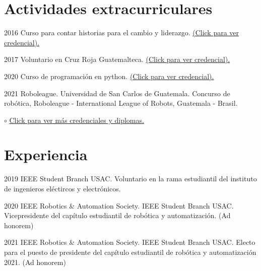 \documentclass[]{twentysecondcv}
\begin{document}

\section{Actividades extracurriculares}

\begin{twentyshort}

	\twentyitemshort
    	{2016}
    	{Curso para contar historias para el cambio y liderazgo. \href{https://www.coursera.org/account/accomplishments/verify/HG4MHZYP8JXW}{(Click para ver credencial).}}
    
	\twentyitemshort
    	{2017}
    	{Voluntario en Cruz Roja Guatemalteca. \href{https://drive.google.com/file/d/1jAEwQjYPLt7i6J_tMbf148fczAosDuUL/view?usp=sharing}{(Click para ver credencial).}}
    	
	\twentyitemshort
    	{2020}
    	{Curso de programación en python. \href{https://drive.google.com/file/d/1jpFnE7331rJEckQXQHI43dER4RIh5iG8/view?usp=sharing}{(Click para ver credencial).}}
    	
    \twentyitem
    	{2021}
    	{Roboleague.}
    	{Universidad de San Carlos de Guatemala.}
    	{Concurso de robótica, Roboleague - International League of Robots, Guatemala - Brasil.}  
    	
    \twentyitemshort
    	{$\circ$}
    	{\href{https://drive.google.com/drive/folders/12Z1kWkxV0z4kHEDPz6H4RN9isYTZlUwt?usp=sharing}{Click para ver más credenciales y diplomas.}}  
    	

    	
\end{twentyshort}



\section{Experiencia}

\begin{twenty}

	\twentyitem
    	{2019}
    	{ }
    	{IEEE Student Branch USAC.}
    	{Voluntario en la rama estudiantil del instituto de ingenieros el\'ectircos y electr\'onicos.}
    	
    	
	\twentyitem
    	{2020}
    	{IEEE Robotics \& Automation Society.}
    	{IEEE Student Branch USAC.}
    	{Vicepresidente del cap\'itulo estudiantil de rob\'otica y automatizaci\'on. (Ad honorem)}

	\twentyitem
    	{2021}
    	{IEEE Robotics \& Automation Society.}
    	{IEEE Student Branch USAC.}
    	{Electo para el puesto de presidente del cap\'itulo estudiantil de rob\'otica y automatizaci\'on 2021. (Ad honorem)}
    
\end{twenty}
\end{document}
